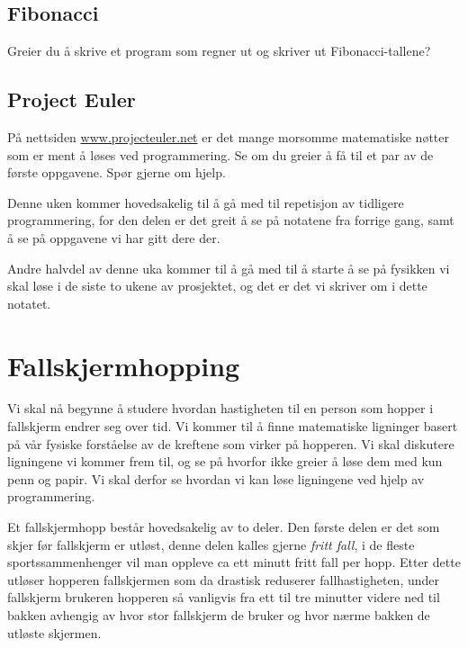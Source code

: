 \documentclass[a4paper, 11pt, notitlepage]{article}
\begin{document}
\subsection*{Fibonacci}
Greier du å skrive et program som regner ut og skriver ut Fibonacci-tallene?
\subsection*{Project Euler}
På nettsiden \url{www.projecteuler.net} er det mange morsomme matematiske nøtter som er ment å løses ved programmering. Se om du greier å få til et par av de første oppgavene. Spør gjerne om hjelp.


Denne uken kommer hovedsakelig til å gå med til repetisjon av tidligere programmering, for den delen er det greit å se på notatene fra forrige gang, samt å se på oppgavene vi har gitt dere der.

Andre halvdel av denne uka kommer til å gå med til å starte å se på fysikken vi skal løse i de siste to ukene av prosjektet, og det er det vi skriver om i dette notatet.


\section{Fallskjermhopping}

Vi skal nå begynne å studere hvordan hastigheten til en person som hopper i fallskjerm endrer seg over tid. Vi kommer til å finne matematiske ligninger basert på vår fysiske forståelse av de kreftene som virker på hopperen. Vi skal diskutere ligningene vi kommer frem til, og se på hvorfor ikke greier å løse dem med kun penn og papir. Vi skal derfor se hvordan vi kan løse ligningene ved hjelp av programmering.


Et fallskjermhopp består hovedsakelig av to deler. Den første delen er det som skjer før fallskjerm er utløst, denne delen kalles gjerne \emph{fritt fall}, i de fleste sportssammenhenger vil man oppleve ca ett minutt fritt fall per hopp. Etter dette utløser hopperen fallskjermen som da drastisk reduserer fallhastigheten, under fallskjerm brukeren hopperen så vanligvis fra ett til tre minutter videre ned til bakken avhengig av hvor stor fallskjerm de bruker og hvor nærme bakken de utløste skjermen.
\end{document}
